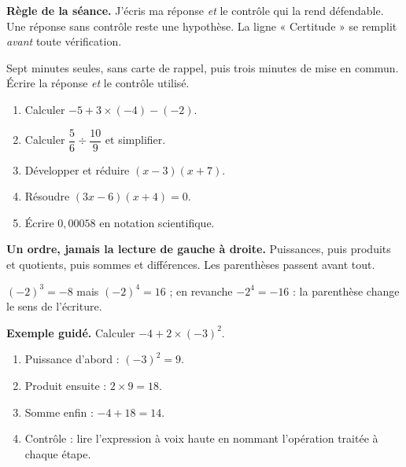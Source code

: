 \documentclass[10pt,a4paper]{article}
\begin{document}
\begin{graybox}\small\textbf{Règle de la séance.} J'écris ma réponse \emph{et} le contrôle qui la rend défendable. Une réponse sans contrôle reste une hypothèse. La ligne « Certitude » se remplit \emph{avant} toute vérification.\end{graybox}
\par\vspace{2mm}
Sept minutes seules, sans carte de rappel, puis trois minutes de mise en commun. Écrire la réponse \emph{et} le contrôle utilisé.
\begin{enumerate}
\item Calculer $-5 + 3\times(-4) - (-2)$.
\item Calculer $\dfrac{5}{6}\div\dfrac{10}{9}$ et simplifier.
\item Développer et réduire $(x-3)(x+7)$.
\item Résoudre $(3x-6)(x+4)=0$.
\item Écrire $0{,}00058$ en notation scientifique.
\end{enumerate}
\certline
\aideline
\needspace{62mm}\par\vspace{3mm}
\begin{methodbox}
\textbf{Un ordre, jamais la lecture de gauche à droite.} Puissances, puis produits et quotients,
puis sommes et différences. Les parenthèses passent avant tout.
\par\smallskip
$(-2)^3 = -8$ mais $(-2)^4 = 16$ ; en revanche $-2^4 = -16$ : la parenthèse change le sens de l'écriture.
\end{methodbox}
\begin{graybox}
\textbf{Exemple guidé.} Calculer $-4 + 2 \times (-3)^2$.
\begin{enumerate}
\item Puissance d'abord : $(-3)^2 = 9$.
\item Produit ensuite : $2 \times 9 = 18$.
\item Somme enfin : $-4 + 18 = 14$.
\item Contrôle : lire l'expression à voix haute en nommant l'opération traitée à chaque étape.
\end{enumerate}
\end{graybox}
\end{document}
